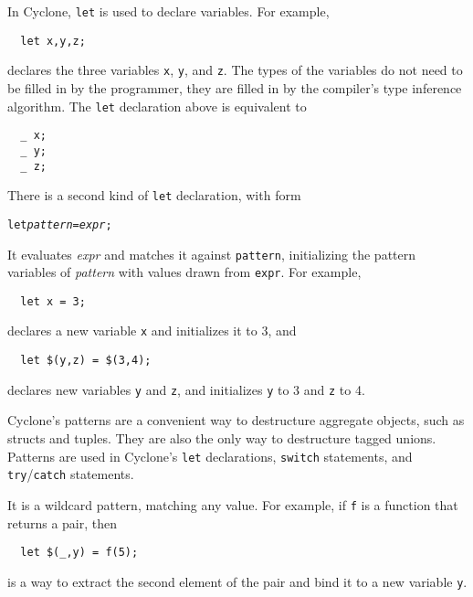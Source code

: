 
In Cyclone, \texttt{let} is used to declare variables.  For example,
\begin{verbatim}
  let x,y,z;
\end{verbatim}
declares the three variables \texttt{x}, \texttt{y}, and \texttt{z}.
The types of the variables do not need to be filled in by the
programmer, they are filled in by the compiler's type inference
algorithm.  The \texttt{let} declaration above is equivalent to
\begin{verbatim}
  _ x;
  _ y;
  _ z;
\end{verbatim}

There is a second kind of \texttt{let} declaration, with form
\begin{alltt}
  let {\it pattern} = {\it expr};
\end{alltt}
It evaluates \textit{expr} and matches it against \texttt{pattern},
initializing the pattern variables of \textit{pattern} with values
drawn from \texttt{expr}.  For example,
\begin{verbatim}
  let x = 3;
\end{verbatim}
declares a new variable \texttt{x} and initializes it to 3, and
\begin{verbatim}
  let $(y,z) = $(3,4);
\end{verbatim}
declares new variables \texttt{y} and \texttt{z}, and initializes
\texttt{y} to 3 and \texttt{z} to 4.


Cyclone's patterns are a convenient way to destructure aggregate
objects, such as structs and tuples.  They are also the only way to
destructure tagged unions.  Patterns are used in Cyclone's
\texttt{let} declarations, \texttt{switch} statements, and
\texttt{try}/\texttt{catch} statements.


It is a wildcard pattern, matching any value.  For example, if
\texttt{f} is a function that returns a pair, then
\begin{verbatim}
  let $(_,y) = f(5); 
\end{verbatim} %
is a way to extract the second element of the pair and bind it to a
new variable \texttt{y}.



